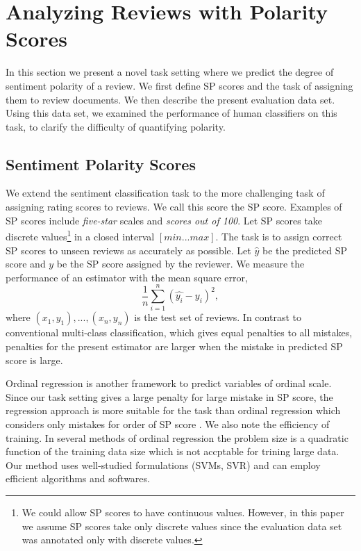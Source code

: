 \documentclass[japanese]{jnlp_1.3d}
\begin{document}
\section{Analyzing Reviews with Polarity Scores}

In this section we present a novel task setting where we predict the degree of sentiment polarity of a review.
We first define   SP scores and the task of assigning them to review documents. We then describe the present evaluation data set. Using this data set, we examined the performance of human classifiers on this task, to clarify the difficulty of quantifying polarity.

\subsection{Sentiment Polarity Scores}
We extend the sentiment classification task to the more challenging task of assigning rating scores to reviews. We call this score the SP score. Examples of SP scores include \textit{five-star} scales and \textit{scores out of 100}. Let SP scores take discrete values\footnote{We could allow SP scores to  have continuous values. However, in this paper we assume SP scores take only discrete values since the evaluation data set was annotated only with discrete values.} in a closed interval $[min ... max]$. The task is to assign correct SP scores to unseen reviews as accurately as possible. Let $\hat{y}$ be the predicted SP score and $y$ be the SP score assigned by the reviewer. We measure the performance of an estimator with the mean square error,
\begin{equation}
 \frac{1}{n}\sum_{i=1}^{n} (\hat{y_i}-y_i)^2,
\end{equation}
where $(x_1,y_1),...,(x_n,y_n)$ is the test set of reviews. In contrast to conventional multi-class classification, which gives equal penalties to all mistakes, penalties for the present estimator are larger when the mistake in predicted SP score is large. 

Ordinal regression \cite{Herb98,LargeM2000,Wei2005} is another framework to predict variables of ordinal scale. Since our task setting gives a large penalty for large mistake in SP score, the regression approach is more suitable for the task than ordinal regression  which considers only mistakes for order of SP score \cite{Herb98,LargeM2000}. We also note the efficiency of training. In several methods of ordinal regression \cite{LargeM2000} the problem size is a quadratic function of the training data size which is not accptable for trining large data. Our method uses well-studied formulations (SVMs, SVR) and can employ efficient algorithms and softwares.
\end{document}
